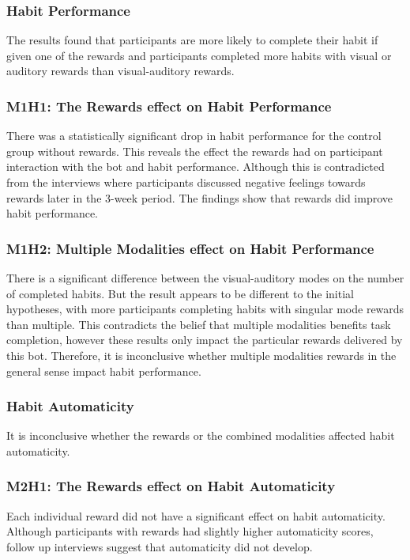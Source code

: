 \subsubsection{Habit Performance}
The results found that participants are more likely to complete their habit if given one of the rewards and participants completed more habits with visual or auditory rewards than visual-auditory rewards.

\subsubsection*{M1H1: The Rewards effect on Habit Performance}
There was a statistically significant drop in habit performance for the control group without rewards. This reveals the effect the rewards had on participant interaction with the bot and habit performance. Although this is contradicted from the interviews where participants discussed negative feelings towards rewards later in the 3-week period. The findings show that rewards did improve habit performance.

\subsubsection*{M1H2: Multiple Modalities effect on Habit Performance}
There is a significant difference between the visual-auditory modes on the number of completed habits. But the result appears to be different to the initial hypotheses, with more participants completing habits with singular mode rewards than multiple. This contradicts the belief that multiple modalities benefits task completion, however these results only impact the particular rewards delivered by this bot. Therefore, it is inconclusive whether multiple modalities rewards in the general sense impact habit performance.


\subsubsection{Habit Automaticity}
It is inconclusive whether the rewards or the combined modalities affected habit automaticity.

\subsubsection*{M2H1: The Rewards effect on Habit Automaticity}
Each individual reward did not have a significant effect on habit automaticity. Although participants with rewards had slightly higher automaticity scores, follow up interviews suggest that automaticity did not develop.

